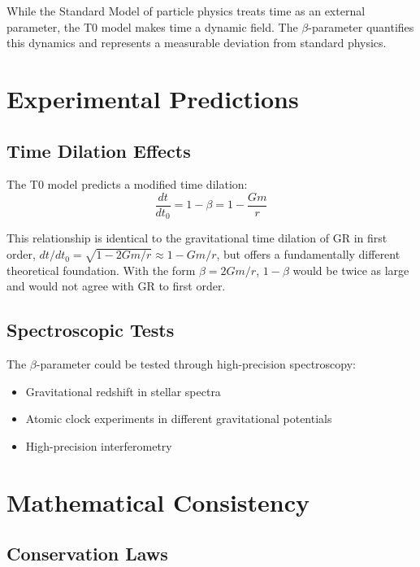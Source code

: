 	While the Standard Model of particle physics treats time as an external parameter, the T0 model makes time a dynamic field. The $\beta$-parameter quantifies this dynamics and represents a measurable deviation from standard physics.
	
	\section{Experimental Predictions}
	\label{sec:experimental_predictions}
	
	\subsection{Time Dilation Effects}
	\label{subsec:time_dilation}
	
	The T0 model predicts a modified time dilation:
	\begin{equation}
		\frac{dt}{dt_0} = 1 - \beta = 1 - \frac{Gm}{r}
	\end{equation}
	
	This relationship is identical to the gravitational time dilation of GR in first order, $dt/dt_0 = \sqrt{1 - 2Gm/r} \approx 1 - Gm/r$, but offers a fundamentally different theoretical foundation. With the form $\beta = 2Gm/r$, $1 - \beta$ would be twice as large and would not agree with GR to first order.
	
	\subsection{Spectroscopic Tests}
	\label{subsec:spectroscopic_tests}
	
	The $\beta$-parameter could be tested through high-precision spectroscopy:
	\begin{itemize}
		\item Gravitational redshift in stellar spectra
		\item Atomic clock experiments in different gravitational potentials
		\item High-precision interferometry
	\end{itemize}
	
	\section{Mathematical Consistency}
	\label{sec:mathematical_consistency}
	
	\subsection{Conservation Laws}
	\label{subsec:conservation_laws}
	
